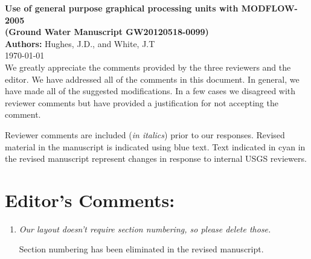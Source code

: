 \documentclass[12pt]{article} %
\begin{document}
\noindent
\textbf{Use of general purpose graphical processing units with MODFLOW-2005 \\ (Ground Water Manuscript GW20120518-0099) }\\

\noindent
\textbf{Authors:} Hughes, J.D., and White, J.T \\

\today \\

\noindent
We greatly appreciate the comments provided by the three reviewers and the editor. We have addressed all of the comments in this document. In general, we have made all of the suggested modifications. In a few cases we disagreed with reviewer comments but have provided a justification for not accepting the comment. 

Reviewer comments are included (\textit{in italics}) prior to our responses. Revised material in the manuscript is indicated using \color{blue} blue \color{black}text. Text indicated in \color{cyan} cyan \color{black} in the revised manuscript represent changes in response to internal USGS reviewers. 

\section*{Editor's Comments:}
\begin{enumerate}
\item \textit{Our layout doesn't require section numbering, so please delete those.}

Section numbering has been eliminated in the revised manuscript.

\end{enumerate}
\end{document}
